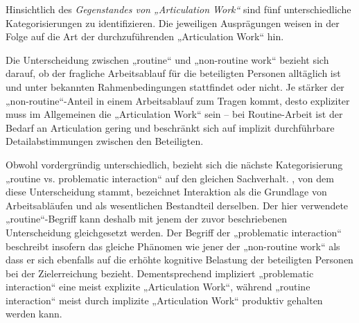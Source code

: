 Hinsichtlich des \emph{Gegenstandes von „Articulation Work“} sind fünf unterschiedliche Kategorisierungen zu identifizieren. Die jeweiligen Ausprägungen weisen in der Folge auf die Art der durchzuführenden „Articulation Work“ hin. 

Die Unterscheidung zwischen „routine“ und „non-routine work“ bezieht sich darauf, ob der fragliche Arbeitsablauf für die beteiligten Personen alltäglich ist und unter bekannten Rahmenbedingungen stattfindet oder nicht. Je stärker der „non-routine“-Anteil in einem Arbeitsablauf zum Tragen kommt, desto expliziter muss im Allgemeinen die „Articulation Work“ sein -- bei Routine-Arbeit ist der Bedarf an Articulation gering und beschränkt sich auf implizit durchführbare Detailabstimmungen zwischen den Beteiligten. 

Obwohl vordergründig unterschiedlich, bezieht sich die nächste Kategorisierung „routine vs. problematic interaction“ auf den gleichen Sachverhalt. \citet{Strauss93}, von dem diese Unterscheidung stammt, bezeichnet Interaktion als die Grundlage von Arbeitsabläufen und als wesentlichen Bestandteil derselben. Der hier verwendete „routine“-Begriff kann deshalb mit jenem der zuvor beschriebenen Unterscheidung gleichgesetzt werden. Der Begriff der „problematic interaction“ beschreibt insofern das gleiche Phänomen wie jener der „non-routine work“ als dass er sich ebenfalls auf die erhöhte kognitive Belastung der beteiligten Personen bei der Zielerreichung bezieht. Dementsprechend impliziert „problematic interaction“ eine meist explizite „Articulation Work“, während „routine interaction“ meist durch implizite „Articulation Work“ produktiv gehalten werden kann.

